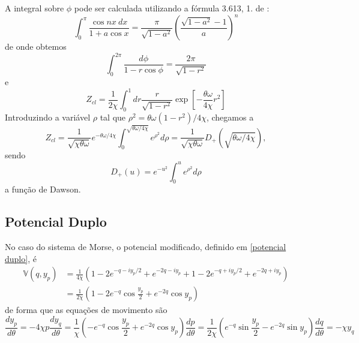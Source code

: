 \documentclass[
	12pt,
	oneside,			%
	a4paper,			%
	english,			%
	brazil				%
	]{abntex2}
\theoremstyle{definition}
\begin{document}
A integral sobre $\phi$ pode ser calculada utilizando a fórmula 3.613, 1. de \cite{gradshteyn2014table}:
\begin{equation}
    \int_0^\pi \frac{\cos nx \ dx}{1+a \cos x} = \frac{\pi}{\sqrt{1-a^2}} \left(\frac{\sqrt{1-a^2}-1}{a} \right)^n
\end{equation}
de onde obtemos
\begin{equation}
    \int_0^{2\pi} \frac{d\phi }{1-r \cos \phi} = \frac{2\pi}{\sqrt{1-r^2}}
\end{equation}
e
\begin{equation}
    Z_{cl} = \frac{1}{2\chi} \int_0^1 d r \frac{r}{\sqrt{1-r^2}} \exp \left[  -\frac{\theta \omega}{4\chi} r^2 \right]
\end{equation}
Introduzindo a variável $\rho$ tal que $\rho^2 = \theta \omega  (1-r^2)/4\chi$, chegamos a
\begin{equation}
    Z_{cl} = \frac{1}{\sqrt{\chi \theta \omega}} e^{-\theta \omega /4\chi} \int_0^{\sqrt{\theta \omega/4\chi}} e^{\rho^2} d\rho =  \frac{1}{\sqrt{\chi \theta \omega}} D_+\left(\sqrt{\theta \omega /4\chi}\right),
\end{equation}
sendo 
\begin{equation}
    D_+(u) = e^{-u^2} \int_0^{u} e^{\rho^2}d\rho
\end{equation}
a função de Dawson.

\subsection{Potencial Duplo}

No caso do sistema de Morse, o potencial modificado, definido em \eqref{potencial duplo}, é
\begin{equation}
    \begin{aligned}
        \mathbb{V}(q,y_p) &= \frac{1}{4\chi} \left( 1-2e^{-q-iy_p/2} + e^{-2q-iy_p} + 1-2e^{-q+iy_p/2} + e^{-2q+iy_p} \right) \\
        &= \frac{1}{2\chi} \left( 1-2e^{-q} \cos\frac{y_p}{2} + e^{-2q} \cos y_p \right)
    \end{aligned}
\end{equation}
de forma que as equações de movimento são
\begin{subequations}
\label{equações de movimento morse}
    \begin{equation}
        \frac{d y_p}{d \theta} = - 4\chi p
    \end{equation}
    \begin{equation}
        \frac{d y_q}{d \theta} = \frac{1}{\chi} \left( -e^{-q} \cos\frac{y_p}{2} + e^{-2q} \cos y_p \right)
    \end{equation}
    \begin{equation}
        \frac{d p}{d \theta} =  \frac{1}{2\chi} \left( e^{-q} \sin\frac{y_p}{2} - e^{-2q} \sin y_p \right)
    \end{equation}
    \begin{equation}
        \frac{d q}{d \theta} = - \chi y_q
    \end{equation}
\end{subequations}
\end{document}
